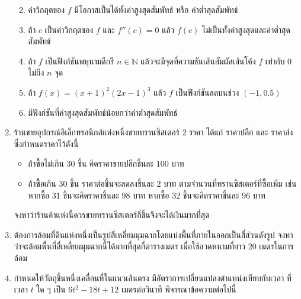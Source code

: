 \documentclass[hidelinks,12pt,a4paper]{article}
\makeatletter
\newcommand{\s}{\space}
\newcommand{\Jitem}{%
  \refstepcounter{\@enumctr}%
  \item[%
    {\raisebox{-0ex}[0pt][0pt]{$\boldsymbol{\textcolor{magenta}{\mathbf{J}}^{\color{blue}{p}}}$}}%
    \,%
    \@nameuse{label\@enumctr}]%
}
\makeatother
\begin{document}
\begin{enumerate}
    \begin{enumerate}
        \renewcommand{\labelenumii}{$\_\_\_\_$\hspace{0.5mm}\arabic{enumii})}
        \item ค่าวิกฤตของ $f$ มีโอกาสเป็นได้ทั้งค่าสูงสุดสัมพัทธ์ หรือ ค่าต่ำสุดสัมพัทธ์
        \vspace{5mm}
        \item ถ้า $c$ เป็นค่าวิกฤตของ $f$ และ $f''(c)=0$ \s แล้ว \s $f(c)$ ไม่เป็นทั้งค่าสูงสุดและค่าต่ำสุดสัมพัทธ์
        \vspace{5mm}
        \item ถ้า $f$ เป็นฟังก์ชันพหุนามดีกรี $n\in\mathbb{N}$ \s แล้วจะมีจุดที่ความชันเส้นสัมผัสเส้นโค้ง $f$ เท่ากับ $0$ ไม่ถึง $n$ จุด
        \vspace{5mm}
        \item ถ้า $f(x)=(x+1)^2(2x-1)^3$ \s แล้ว \s $f$ เป็นฟังก์ชันลดบนช่วง $(-1,0.5)$
        \vspace{5mm}
        \item มีฟังก์ชันที่ค่าสูงสุดสัมพัทธ์น้อยกว่าค่าต่ำสุดสัมพัทธ์
    \end{enumerate}
    \newpage
    \item ร้านขายอุปกรณ์อิเล็กทรอนิกส์แห่งหนึ่งขายทรานซิสเตอร์ 2 ราคา ได้แก่ ราคาปลีก และ ราคาส่ง ซึ่งกำหนดราคาไว้ดังนี้
        \begin{itemize}
            \item ถ้าซื้อไม่เกิน $30$ ชิ้น คิดราคาขายปลีกชิ้นละ $100$ บาท
            \item ถ้าซื้อเกิน $30$ ชิ้น ราคาต่อชิ้นจะลดลงชิ้นละ $2$ บาท ตามจำนวนที่ทรานซิสเตอร์ที่ซื้อเพิ่ม เช่น หากซื้อ 31 ชิ้นจะคิดราคาชิ้นละ $98$ บาท หากซื้อ $32$ ชิ้นจะคิดราคาชิ้นละ $96$ บาท 
        \end{itemize}
    จงหาว่าร้านค้าแห่งนี้ควรขายทรานซิสเตอร์กี่ชิ้นจึงจะได้เงินมากที่สุด
    \vspace{60mm}
    \Jitem ต้องการล้อมที่ดินแห่งหนึ่งเป็นรูปสี่เหลี่ยมมุมฉากโดยแบ่งพื้นที่ภายในออกเป็นสี่ส่วนดังรูป จงหาว่าจะล้อมพื้นที่สี่เหลี่ยมมุมฉากนี้ได้มากที่สุดกี่ตารางเมตร เมื่อใช้ลวดหนามที่ยาว $20$ เมตรในการล้อม
    \begin{center}
    \end{center}
    \newpage
    \item กำหนดให้วัตถุชิ้นหนึ่งเคลื่อนที่ในแนวเส้นตรง มีอัตราการเปลี่ยนแปลงตำแหน่งเทียบกับเวลา ที่เวลา $t$ ใด ๆ เป็น $6t^2-18t+12$ เมตรต่อวินาที พิจารณาข้อความต่อไปนี้

\end{enumerate}
\end{document}

